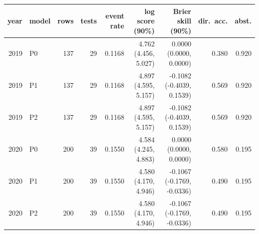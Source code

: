 \begin{tabular}{rlrrrrrrr}
\toprule
year & model & rows & tests & event rate & log score (90\%) & Brier skill (90\%) & dir.\ acc. & abst. \\
\midrule
2019 & P0 & 137 & 29 & 0.1168 & 4.762 (4.456, 5.027) & 0.0000 (0.0000, 0.0000) & 0.380 & 0.920 \\
2019 & P1 & 137 & 29 & 0.1168 & 4.897 (4.595, 5.157) & -0.1082 (-0.4039, 0.1539) & 0.569 & 0.920 \\
2019 & P2 & 137 & 29 & 0.1168 & 4.897 (4.595, 5.157) & -0.1082 (-0.4039, 0.1539) & 0.569 & 0.920 \\
2020 & P0 & 200 & 39 & 0.1550 & 4.584 (4.245, 4.883) & 0.0000 (0.0000, 0.0000) & 0.580 & 0.195 \\
2020 & P1 & 200 & 39 & 0.1550 & 4.580 (4.170, 4.946) & -0.1067 (-0.1769, -0.0336) & 0.490 & 0.195 \\
2020 & P2 & 200 & 39 & 0.1550 & 4.580 (4.170, 4.946) & -0.1067 (-0.1769, -0.0336) & 0.490 & 0.195 \\
\bottomrule
\end{tabular}
